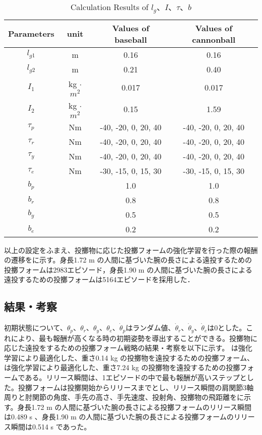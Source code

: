 \begin{table}[tb]
  \begin{center}
    \caption{Calculation Results of $l_{g}$、$I$、$\tau$、$b$}

    \begin{tabular}{c c c c}
      \hline
      Parameters & unit & Values of baseball & Values of cannonball \\
      \hline
      $l_{g1}$ & m & 0.16 & 0.16 \\
      $l_{g2}$ & m & 0.21 & 0.40 \\
      $I_{1}$ & kg $\cdot$ ${m}^2$ & 0.017 & 0.017 \\
      $I_{2}$ & kg $\cdot$ ${m}^2$ & 0.15 & 1.59 \\
      $\tau_{p}$ & Nm & -40, -20, 0, 20, 40 & -40, -20, 0, 20, 40 \\
      $\tau_{r}$ & Nm & -40, -20, 0, 20, 40 & -40, -20, 0, 20, 40 \\
      $\tau_{y}$ & Nm & -40, -20, 0, 20, 40 & -40, -20, 0, 20, 40 \\
      $\tau_{e}$ & Nm & -30, -15, 0, 15, 30 & -30, -15, 0, 15, 30 \\
      $b_{p}$ &  & 1.0 & 1.0\\
      $b_{r}$ &  & 0.8 & 0.8\\
      $b_{y}$ &  & 0.5 & 0.5\\
      $b_{e}$ &  & 0.2 & 0.2\\
      \hline
    \end{tabular}
  \end{center}
\end{table}

以上の設定をふまえ、投擲物に応じた投擲フォームの強化学習を行った際の報酬の遷移をに示す。身長1.72 m の人間に基づいた腕の長さによる遠投するための投擲フォームは2983エピソード，身長1.90 m の人間に基づいた腕の長さによる遠投するための投擲フォームは5164エピソードを採用した．


\subsection{結果・考察}
初期状態について、$\theta_{p}$、$\theta_{r}$、$\theta_{y}$、$\theta_{e}$、$\dot{\theta}_{p}$はランダム値、$\dot{\theta}_{r}$、$\dot{\theta}_{y}$、$\dot{\theta}_{e}$は0とした。これにより、最も報酬が高くなる時の初期姿勢を導出することができる。投擲物に応じた遠投をするための投擲フォーム戦略の結果・考察を以下に示す。
は強化学習により最適化した、重さ0.14 kg の投擲物を遠投するための投擲フォーム、は強化学習により最適化した、重さ7.24 kg の投擲物を遠投するための投擲フォームである。リリース瞬間は、1エピソードの中で最も報酬が高いステップとした。投擲フォームは投擲開始からリリースまでとし、リリース瞬間の肩関節3軸周りと肘関節の角度、手先の高さ、手先速度、投射角、投擲物の飛距離をに示す。身長1.72 m の人間に基づいた腕の長さによる投擲フォームのリリース瞬間は0.489 s 、身長1.90 m の人間に基づいた腕の長さによる投擲フォームのリリース瞬間は0.514 s であった。

